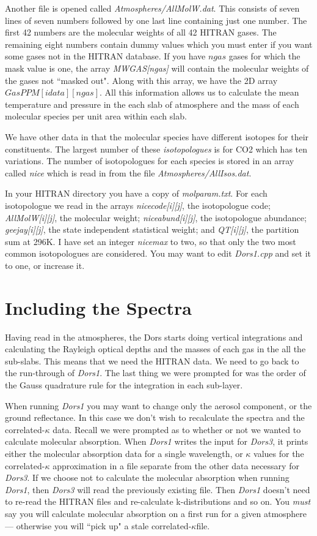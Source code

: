 \documentclass[12pt]{article}
\begin{document}
Another file is opened called {\it Atmospheres/AllMolW.dat}. This consists of seven
lines of seven numbers followed by one last line containing just one number. The first 42
numbers are the molecular weights of all 42 HITRAN gases. The remaining eight numbers
contain dummy values which you must enter if you want some gases not in the HITRAN
database. If you have $ngas$ gases for which the mask value is one, the array
{\it MWGAS[ngas]} will contain the molecular weights of the gases not ``masked out".
Along with this array, we have the  2D array $GasPPM[idata][ngas]$. All this information
allows us to calculate the mean temperature and pressure in the each slab of atmosphere
and the mass of each molecular species per unit area within each slab.

We have other data in that the molecular species have different isotopes for their constituents.
 The largest number of these {\it isotopologues} is for CO2 which has ten variations.
The number of isotopologues for each species is stored in an array called {\it nice} which
is read in from the file {\it Atmospheres/AllIsos.dat}.

In your {HITRAN} directory you have a copy of {\it molparam.txt}. For each isotopologue
we read in the arrays {\it nicecode[i][j]}, the isotopologue code; {\it AllMolW[i][j]}, the molecular
weight; {\it niceabund[i][j]}, the isotopologue abundance; {\it geejay[i][j]}, the state independent 
statistical weight; and {\it QT[i][j]}, the partition sum at 296K. I have set an integer {\it nicemax}
to two, so that only the two most common isotopologues are considered. You may want to edit
{\it Dors1.cpp} and set it to one, or increase it.


\section{Including the Spectra}

Having read in the atmospheres, the Dors starts doing vertical integrations and calculating
the Rayleigh optical depths and the masses of each gas in the all the sub-slabs. This
means that we need the HITRAN data. We need to go back to the run-through of {\it Dors1}.
The last thing we were prompted for was the order of the Gauss quadrature rule for the integration
in each sub-layer.

When running {\it Dors1} you may want to change only the aerosol component, or the ground reflectance.
In this case we don't wish to recalculate the spectra and the correlated-$\kappa$ data. Recall we
 were prompted as to whether or not we wanted to calculate molecular absorption.
When {\it Dors1} writes the input for {\it Dors3}, it prints either the molecular absorption
 data for a single wavelength,
 or $\kappa$ values for the correlated-$\kappa$ approximation in a file separate from the other data necessary for
{\it Dors3}. If we choose not to calculate the molecular absorption when running {\it Dors1}, then {\it Dors3} will read the previously
existing file.
Then {\it Dors1} doesn't need to re-read the HITRAN files and re-calculate k-distributions and so on.
 You {\it must}
say you will calculate molecular absorption on a first run for a given atmosphere  --- otherwise you
will ``pick up" a stale correlated-$\kappa$file.
\end{document}
